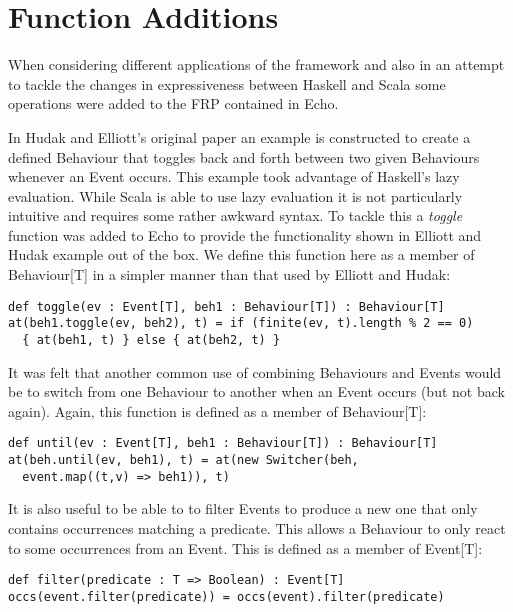   \section{Function Additions}
    When considering different applications of the framework and also in an attempt to
    tackle the changes in expressiveness between Haskell and Scala some operations
    were added to the FRP contained in Echo.
        
    In Hudak and Elliott's original paper an example is constructed to create a defined Behaviour
    that toggles back and forth between two given Behaviours whenever an Event occurs. This
    example took advantage of Haskell's lazy evaluation. While Scala is able to use lazy evaluation
    it is not particularly intuitive and requires some rather awkward syntax. To tackle this
    a \emph{toggle} function was added to Echo to provide the functionality shown in Elliott and Hudak example out of the box.
    We define this function here as a member of Behaviour[T] in a simpler manner than that used by Elliott and Hudak:
    
\begin{verbatim}
def toggle(ev : Event[T], beh1 : Behaviour[T]) : Behaviour[T]
at(beh1.toggle(ev, beh2), t) = if (finite(ev, t).length % 2 == 0)
  { at(beh1, t) } else { at(beh2, t) }
\end{verbatim}        
    
    It was felt that another common use of combining Behaviours and Events would be
    to switch from one Behaviour to another when an Event occurs (but not back again). Again, this
    function is defined as a member of Behaviour[T]:

\begin{verbatim}
def until(ev : Event[T], beh1 : Behaviour[T]) : Behaviour[T]
at(beh.until(ev, beh1), t) = at(new Switcher(beh, 
  event.map((t,v) => beh1)), t)
\end{verbatim}        
    
    It is also useful to be able to to filter Events to produce a new one that only
    contains occurrences matching a predicate. This allows a Behaviour to only react
    to some occurrences from an Event. This is defined as a member of Event[T]:

\begin{verbatim}
def filter(predicate : T => Boolean) : Event[T]
occs(event.filter(predicate)) = occs(event).filter(predicate)
\end{verbatim}  

